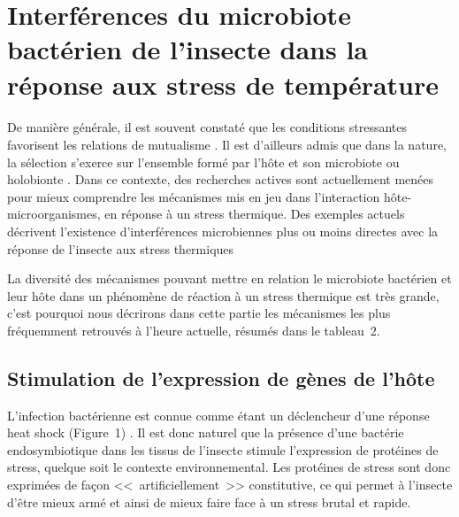 \section{Interférences du microbiote bactérien de l'insecte dans la réponse aux stress de température} %

\paragraph*{}
De manière générale, il est souvent constaté que les conditions stressantes favorisent les relations de mutualisme \cite{meadows2013}.
Il est d'ailleurs admis que dans la nature, la sélection s'exerce sur l'ensemble formé par l'hôte et son microbiote ou holobionte \cite{rosenberg2008}.
Dans ce contexte, des recherches actives sont actuellement menées pour mieux comprendre les mécanismes mis en jeu dans l'interaction hôte-microorganismes, en réponse à un stress thermique.
Des exemples actuels décrivent l'existence d'interférences microbiennes plus ou moins directes avec la réponse de l'insecte aux stress thermiques

La diversité des mécanismes pouvant mettre en relation le microbiote bactérien et leur hôte dans un phénomène de réaction à un stress thermique est très grande, c'est pourquoi nous décrirons dans cette partie les mécanismes les plus fréquemment retrouvés à l'heure actuelle, résumés dans le tableau~2.

\subsection{Stimulation de l'expression de gènes de l'hôte}

L'infection bactérienne est connue comme étant un déclencheur d'une réponse heat shock (Figure~1) \cite{sorensen2003}.
Il est donc naturel que la présence d'une bactérie endosymbiotique dans les tissus de l'insecte stimule l'expression de protéines de stress, quelque soit le contexte environnemental.
Les protéines de stress sont donc exprimées de façon <<~artificiellement~>> constitutive, ce qui permet à l'insecte d'être mieux armé et ainsi de mieux faire face à un stress brutal et rapide.

